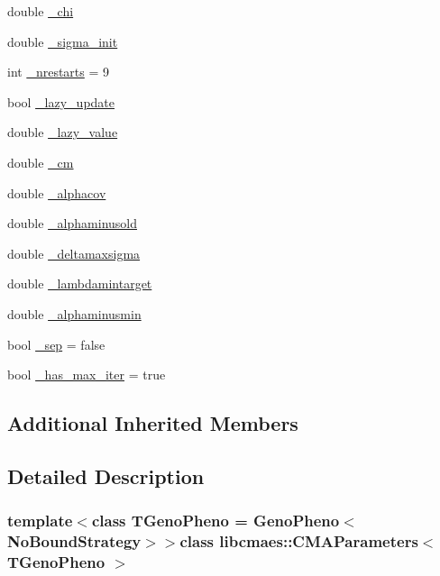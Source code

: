 \begin{DoxyCompactItemize}
\item 
double \hyperlink{classlibcmaes_1_1CMAParameters_ab63f8f5d707242ec981945df88a573db}{\-\_\-chi}
\item 
double \hyperlink{classlibcmaes_1_1CMAParameters_a8ad9eb52bd8ffcfc4ea175fef21c8f96}{\-\_\-sigma\-\_\-init}
\item 
int \hyperlink{classlibcmaes_1_1CMAParameters_a2ccf2865600fe20d965af9bdf9c6ab60}{\-\_\-nrestarts} = 9
\item 
bool \hyperlink{classlibcmaes_1_1CMAParameters_ac65bf2bb1b20461cfe8bd58175727ccc}{\-\_\-lazy\-\_\-update}
\item 
double \hyperlink{classlibcmaes_1_1CMAParameters_ae00e6b49bd99e1aa316bec03da96e95b}{\-\_\-lazy\-\_\-value}
\item 
double \hyperlink{classlibcmaes_1_1CMAParameters_a34e3414332daf15d81b353c7de803e1d}{\-\_\-cm}
\item 
double \hyperlink{classlibcmaes_1_1CMAParameters_ae13b411e5035c574e1521afa4b6d734b}{\-\_\-alphacov}
\item 
double \hyperlink{classlibcmaes_1_1CMAParameters_a3dfb7a180cb3746a4bc3a2d82b8a8f35}{\-\_\-alphaminusold}
\item 
double \hyperlink{classlibcmaes_1_1CMAParameters_a011a9f790bc21c6bea155066a26f5181}{\-\_\-deltamaxsigma}
\item 
double \hyperlink{classlibcmaes_1_1CMAParameters_afc8800d362e2b25074610b883684156b}{\-\_\-lambdamintarget}
\item 
double \hyperlink{classlibcmaes_1_1CMAParameters_a8d4e4afdbdb72635241846562fc37a04}{\-\_\-alphaminusmin}
\item 
bool \hyperlink{classlibcmaes_1_1CMAParameters_ad7f26f864149ce4d62169e15daa530fa}{\-\_\-sep} = false
\item 
bool \hyperlink{classlibcmaes_1_1CMAParameters_a9a66e6d8cf1e1c67cd9c43d5c87a71d1}{\-\_\-has\-\_\-max\-\_\-iter} = true
\end{DoxyCompactItemize}
\subsection*{Additional Inherited Members}


\subsection{Detailed Description}
\subsubsection*{template$<$class T\-Geno\-Pheno = Geno\-Pheno$<$\-No\-Bound\-Strategy$>$$>$class libcmaes\-::\-C\-M\-A\-Parameters$<$ T\-Geno\-Pheno $>$}

